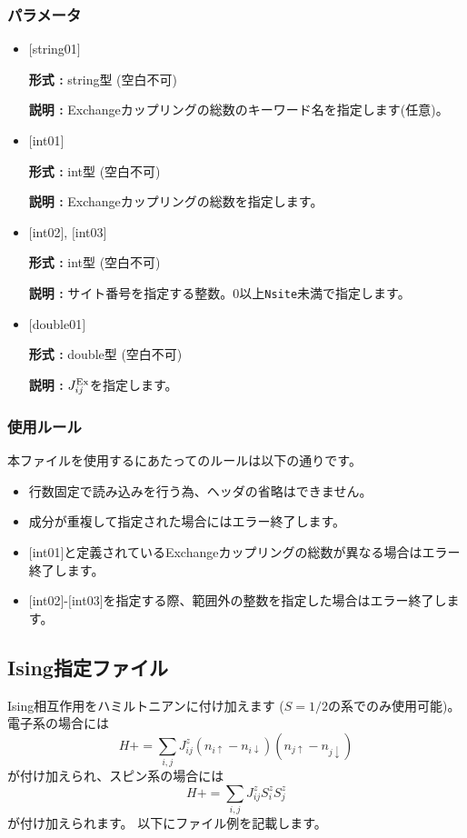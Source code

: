 \subsubsection{パラメータ}
 \begin{itemize}

   \item  $[$string01$]$
   
    {\bf 形式 :} string型 (空白不可)

   {\bf 説明 :} Exchangeカップリングの総数のキーワード名を指定します(任意)。

   \item  $[$int01$]$
   
    {\bf 形式 :} int型 (空白不可)

   {\bf 説明 :} Exchangeカップリングの総数を指定します。

  \item  $[$int02$]$, $[$int03$]$
  
 {\bf 形式 :} int型 (空白不可)

{\bf 説明 :} サイト番号を指定する整数。0以上\verb|Nsite|{未満}で指定します。
 
 \item  $[$double01$]$
   
   {\bf 形式 :} double型 (空白不可)

  {\bf 説明 :}  $J_{ij}^{\rm Ex}$を指定します。
  
\end{itemize}

\subsubsection{使用ルール}
本ファイルを使用するにあたってのルールは以下の通りです。
\begin{itemize}
\item 行数固定で読み込みを行う為、ヘッダの省略はできません。
\item 成分が重複して指定された場合にはエラー終了します。
\item $[$int01$]$と定義されているExchangeカップリングの総数が異なる場合はエラー終了します。
\item $[$int02$]$-$[$int03$]$を指定する際、範囲外の整数を指定した場合はエラー終了します。
\end{itemize}

\newpage
\subsection{Ising指定ファイル}
Ising相互作用をハミルトニアンに付け加えます{ ($S=1/2$の系でのみ使用可能)}。
電子系の場合には
\begin{equation}
H+=\sum_{i,j}J_{ij}^{z} (n_{i\uparrow}-n_{i\downarrow})(n_{j\uparrow}-n_{j\downarrow} )
\end{equation}
が付け加えられ、スピン系の場合には
\begin{equation}
H+=\sum_{i,j}J_{ij}^{z} S_ {i}^{z}S_{j}^z
\end{equation}
が付け加えられます。
以下にファイル例を記載します。

